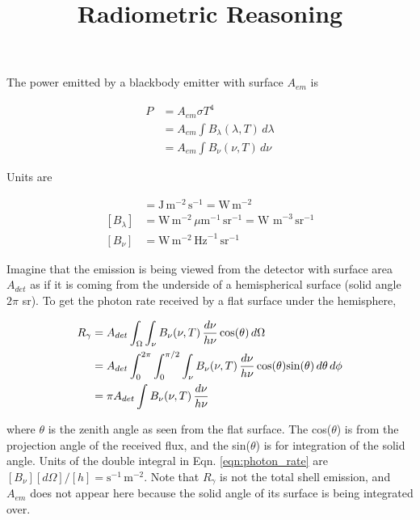 \documentclass[11pt]{article}
\title{Radiometric Reasoning}
\author{}
\date{}
\begin{document}
\maketitle


The power emitted by a blackbody emitter with surface $A_{em}$ is 

\begin{align}
  P &= A_{em} \sigma T^4 \\
    &= A_{em} \int B_\lambda(\lambda, T) \, d\lambda \\
    &= A_{em} \int B_\nu(\nu, T) \, d\nu
\end{align}

Units are

\begin{align}
    [P] &= \textrm{J}\,\textrm{m}^{-2}\,\textrm{s}^{-1} = \textrm{W}\,\textrm{m}^{-2} \\
    [B_{\lambda}] &= \textrm{W}\,\textrm{m}^{-2}\, \mu\textrm{m}^{-1}\,\textrm{sr}^{-1} = \textrm{W m}^{-3}\,\textrm{sr}^{-1} \\
    [B_{\nu}] &= \textrm{W}\,\textrm{m}^{-2}\, \textrm{Hz}^{-1}\,\textrm{sr}^{-1}
\end{align}

Imagine that the emission is being viewed from the detector with surface area $A_{det}$ as if it is coming from the underside of a 
hemispherical surface (solid angle $2 \pi$ sr). To get the photon rate received by a flat surface under the hemisphere, 

\begin{align}
    \label{eqn:photon_rate}
    R_{\gamma} &= A_{det} \int_{\Omega} \int_{\nu} B_{\nu}(\nu, T) \, \frac{d\nu}{h\nu} \, \textrm{cos}(\theta) \textrm \, d\Omega   \\
    &= A_{det} \int_{0}^{2\pi} \int_{0}^{\pi/2} \int_{\nu} B_{\nu}(\nu, T) \, \frac{d\nu}{h\nu} \, \textrm{cos}(\theta) \textrm{sin}(\theta) \, d\theta \, d\phi \\
    &= \pi A_{det} \int B_{\nu}(\nu, T) \, \frac{d\nu}{h\nu}  \\
\end{align}

\noindent
where $\theta$ is the zenith angle as seen from the flat surface. The cos($\theta$) is from the projection angle of the received flux, and the sin($\theta$) is for integration of the solid angle. Units of the double integral in Eqn. \ref{eqn:photon_rate} are $[B_{\nu}][d\Omega]/[h] = \textrm{s}^{-1}\,\textrm{m}^{-2}$. Note that $R_{\gamma}$ is not the total shell emission, and $A_{em}$ does not appear here because the solid angle of its surface is being integrated over.
\end{document}
